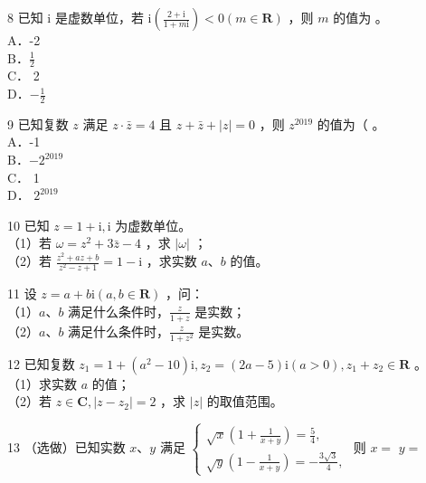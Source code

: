 \documentclass[10pt]{article}
\begin{document}
8 已知 i 是虚数单位，若 \(\mathrm{i}\left(\frac{2+\mathrm{i}}{1+m \mathrm{i}}\right)<0(m \in \mathbf{R})\) ，则 \(m\) 的值为 。\\
A．-2\\
B．\(\frac{1}{2}\)\\
C． 2\\
D．\(-\frac{1}{2}\)

9 已知复数 \(z\) 满足 \(z \cdot \bar{z}=4\) 且 \(z+\bar{z}+|z|=0\) ，则 \(z^{2019}\) 的值为（ 。\\
A．-1\\
B．\(-2^{2019}\)\\
C． 1\\
D． \(2^{2019}\)

10 已知 \(z=1+\mathrm{i}, \mathrm{i}\) 为虚数单位。\\
（1）若 \(\omega=z^{2}+3 \bar{z}-4\) ，求 \(|\omega|\) ；\\
（2）若 \(\frac{z^{2}+a z+b}{z^{2}-z+1}=1-\mathrm{i}\) ，求实数 \(a 、 b\) 的值。

11 设 \(z=a+b \mathrm{i}(a, b \in \mathbf{R})\) ，问：\\
（1）\(a 、 b\) 满足什么条件时，\(\frac{z}{1+z}\) 是实数；\\
（2）\(a 、 b\) 满足什么条件时，\(\frac{z}{1+z^{2}}\) 是实数。

12 已知复数 \(z_{1}=1+\left(a^{2}-10\right) \mathrm{i}, z_{2}=(2 a-5) \mathrm{i}(a>0), z_{1}+z_{2} \in \mathbf{R}\) 。\\
（1）求实数 \(a\) 的值；\\
（2）若 \(z \in \mathbf{C},\left|z-z_{2}\right|=2\) ，求 \(|z|\) 的取值范围。

13 （选做）已知实数 \(x 、 y\) 满足 \(\left\{\begin{array}{l}\sqrt{x}\left(1+\frac{1}{x+y}\right)=\frac{5}{4}, \\ \sqrt{y}\left(1-\frac{1}{x+y}\right)=-\frac{3 \sqrt{3}}{4},\end{array}\right.\) 则 \(x=\) \(y=\)
\end{document}
